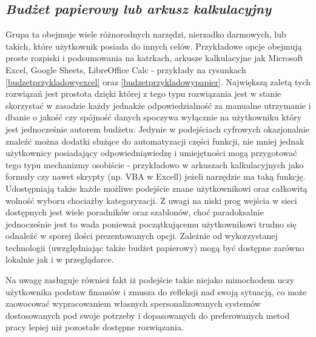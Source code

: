 \documentclass[a4paper,10pt, twoside]{report}
\newcommand{\customstylesection}[1]{\textbf{\textit{#1}}}
\begin{document}
\begin{large}
\section{\customstylesection{Budżet papierowy lub arkusz kalkulacyjny}}
{Grupa ta obejmuje wiele różnorodnych narzędzi, nierzadko darmowych, lub takich, 
które użytkownik posiada do innych celów. Przykładowe opcje obejmują proste 
rozpiski i podsumowania na katrkach, arkusze kalkulacyjne jak Microsoft 
Excel, Google Sheets, LibreOffice Calc - przykłady na rysunkach 
\ref{budzetprzykladowyexcel} oraz \ref{budzetprzykladowypapier}. Największą 
zaletą tych rozwiązań jest prostota dzięki której z tego typu rozwiązania jest 
w stanie skorzystać w zasadzie każdy jednakże odpowiedzialność za manualne 
utrzymanie i dbanie o jakość czy spójność danych spoczywa wyłącznie na 
użytkowniku który jest jednocześnie autorem budżetu. Jedynie w podejściach 
cyfrowych okazjonalnie znaleźć można dodatki służące do automatyzacji części 
funkcji, nie mniej jednak użytkownicy posiadający odpowiedniąwiedzę i 
umiejętności mogą przygotować tego typu mechanizmy osobiście - przykładowo w 
arkuszach kalkulacyjnych jako formuły czy nawet skrypty (np. VBA w Excell) 
jeżeli narzędzie ma taką funkcję. Udostępniają także każde możliwe podejście 
znane użytkownikowi oraz całkowitą wolność wyboru chociażby kategoryzacji. Z 
uwagi na niski prog wejścia w sieci dostępnych jest wiele poradników oraz 
szablonów, choć paradoksalnie jednocześnie jest to wada ponieważ początkującemu 
użytkownikowi trudno się odnaleźć w sporej ilości prezentowanych opcji. Zależnie
 od wykorzystanej technologii (uwzględniając także budżet papierowy) mogą być 
dostępne zarówno lokalnie jak i w przeglądarce.}

{Na uwagę zasługuje również fakt iż podejście takie niejako mimochodem uczy 
użytkownika podstaw finansów i zmusza do refleksji nad swoją sytuacją, co może 
zaowocować wypracowaniem własnych spersonalizowanych systemów dostosowanych pod 
swoje potrzeby i dopasowanych do preferowanych metod pracy lepiej niż pozostałe 
dostępne rozwiązania.}


\end{large}
\end{document}
